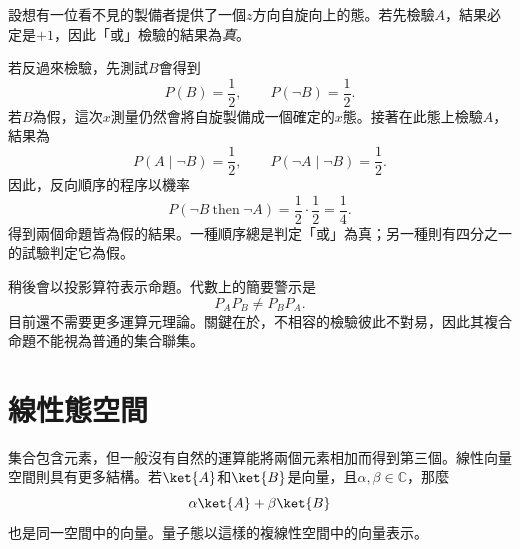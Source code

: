 設想有一位看不見的製備者提供了一個\(z\)方向自旋向上的態。若先檢驗\(A\)，結果必定是\(+1\)，因此「或」檢驗的結果為\emph{真}。

若反過來檢驗，先測試\(B\)會得到
\[
P(B)=\frac12,\qquad P(\neg B)=\frac12.
\]
若\(B\)為假，這次\(x\)測量仍然會將自旋製備成一個確定的\(x\)態。接著在此態上檢驗\(A\)，結果為
\[
P(A\mid \neg B)=\frac12,\qquad
P(\neg A\mid \neg B)=\frac12.
\]
因此，反向順序的程序以機率
\begin{equation}
P(\neg B\ \text{then}\ \neg A)
=\frac12\cdot\frac12=\frac14.
\end{equation}
得到兩個命題皆為假的結果。一種順序總是判定「或」為真；另一種則有四分之一的試驗判定它為假。

\begin{classroomqa}
\end{classroomqa}

\begin{classroomqa}
\end{classroomqa}

稍後會以投影算符表示命題。代數上的簡要警示是
\begin{equation}
P_A P_B\ne P_B P_A.
\end{equation}
目前還不需要更多運算元理論。關鍵在於，不相容的檢驗彼此不對易，因此其複合命題不能視為普通的集合聯集。

\begin{classroomqa}
\end{classroomqa}

\section{線性態空間}

集合包含元素，但一般沒有自然的運算能將兩個元素相加而得到第三個。線性向量空間則具有更多結構。若\(\ket{A}\)和\(\ket{B}\)是向量，且\(\alpha,\beta\in\mathbb C\)，那麼
\begin{equation}
\alpha\ket{A}+\beta\ket{B}
\end{equation}
也是同一空間中的向量。量子態以這樣的複線性空間中的向量表示。


